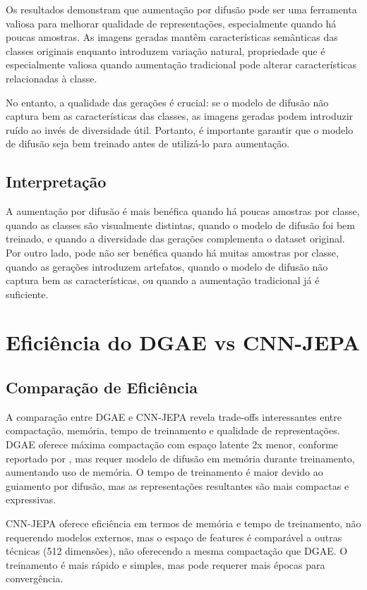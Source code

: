 Os resultados demonstram que aumentação por difusão pode ser uma ferramenta valiosa para melhorar qualidade de representações, especialmente quando há poucas amostras. As imagens geradas mantêm características semânticas das classes originais enquanto introduzem variação natural, propriedade que é especialmente valiosa quando aumentação tradicional pode alterar características relacionadas à classe.

No entanto, a qualidade das gerações é crucial: se o modelo de difusão não captura bem as características das classes, as imagens geradas podem introduzir ruído ao invés de diversidade útil. Portanto, é importante garantir que o modelo de difusão seja bem treinado antes de utilizá-lo para aumentação.

\subsection{Interpretação}

A aumentação por difusão é mais benéfica quando há poucas amostras por classe, quando as classes são visualmente distintas, quando o modelo de difusão foi bem treinado, e quando a diversidade das gerações complementa o dataset original. Por outro lado, pode não ser benéfica quando há muitas amostras por classe, quando as gerações introduzem artefatos, quando o modelo de difusão não captura bem as características, ou quando a aumentação tradicional já é suficiente.

\section{Eficiência do DGAE vs CNN-JEPA}

\subsection{Comparação de Eficiência}

A comparação entre DGAE e CNN-JEPA revela trade-offs interessantes entre compactação, memória, tempo de treinamento e qualidade de representações. DGAE oferece máxima compactação com espaço latente 2x menor, conforme reportado por \cite{liu2025dgae}, mas requer modelo de difusão em memória durante treinamento, aumentando uso de memória. O tempo de treinamento é maior devido ao guiamento por difusão, mas as representações resultantes são mais compactas e expressivas.

CNN-JEPA oferece eficiência em termos de memória e tempo de treinamento, não requerendo modelos externos, mas o espaço de features é comparável a outras técnicas (512 dimensões), não oferecendo a mesma compactação que DGAE. O treinamento é mais rápido e simples, mas pode requerer mais épocas para convergência.

